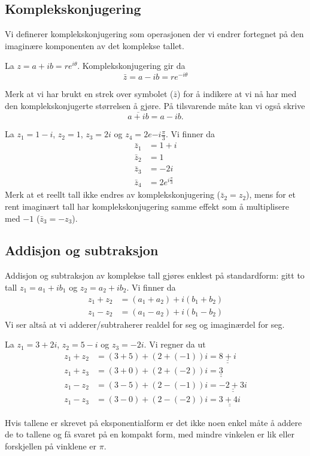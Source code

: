 \documentclass[a4paper,norsk,12pt]{article}
\newcommand{\ans}[1]{\underline{\underline{#1}}}
\newcounter{exa}
\begin{document}
\subsection{Komplekskonjugering}
Vi definerer komplekskonjugering som operasjonen der vi endrer fortegnet på den imaginære komponenten av det komplekse tallet.
\begin{tdef}
	La $z = a + ib = re^{i\theta}$. Komplekskonjugering gir da
	\begin{displaymath}
		\bar{z} = a-ib = re^{-i\theta}
	\end{displaymath}
\end{tdef}
Merk at vi har brukt en strek over symbolet ($\bar{z}$) for å indikere at vi nå har med den komplekskonjugerte størrelsen å gjøre. På tilsvarende måte kan vi også skrive
\begin{displaymath}
	\overline{a+ib} = a - ib.
\end{displaymath}
\begin{texample}
	La $z_1 = 1 - i$, $z_2 = 1$, $z_3 = 2i$ og $z_4 = 2e{-i\frac{\pi}{3}}$. Vi finner da
	\begin{align*}
		\bar{z} _1&= 1+i \\
		\bar{z}_2 &= 1 \\
		\bar{z}_3 &= -2i \\
		\bar{z}_4 &= 2e^{i\frac{\pi}{3}}
	\end{align*}
	Merk at et reellt tall ikke endres av komplekskonjugering ($\bar{z}_2 = z_2$), mens for et rent imaginært tall har komplekskonjugering samme effekt som å multiplisere med $-1$ ($\bar{z}_3 = -z_3$).
\end{texample}

\subsection{Addisjon og subtraksjon}
Addisjon og subtraksjon av komplekse tall gjøres enklest på standardform: gitt to tall $z_1 = a_1 + ib_1$ og $z_2 = a_2 + ib_2$. Vi finner da
\begin{align*}
	z_1 + z_2 &= (a_1+a_2) + i(b_1+b_2) \\
	z_1 - z_2 &= (a_1-a_2) + i(b_1-b_2)
\end{align*}
Vi ser altså at vi adderer/subtraherer realdel for seg og imaginærdel for seg.

\begin{texample}
	La $z_1 = 3+ 2i$, $z_2 = 5-i$ og $z_3 = -2i$. Vi regner da ut
	\begin{align*}
		z_1 + z_2 &= (3+5) + (2+(-1))i = \ans{8 + i} \\
		z_1 + z_3 &= (3+0) + (2+(-2))i = \ans{3} \\
		z_1 - z_2 &= (3-5) + (2-(-1))i = \ans{-2 + 3i} \\
		z_1 - z_3 &= (3-0) + (2-(-2))i = \ans{3 + 4i}
	\end{align*}
\end{texample}
Hvis tallene er skrevet på eksponentialform er det ikke noen enkel måte å addere de to tallene og få svaret på en kompakt form, med mindre vinkelen er lik eller forskjellen på vinklene er $\pi$.
\end{document}
